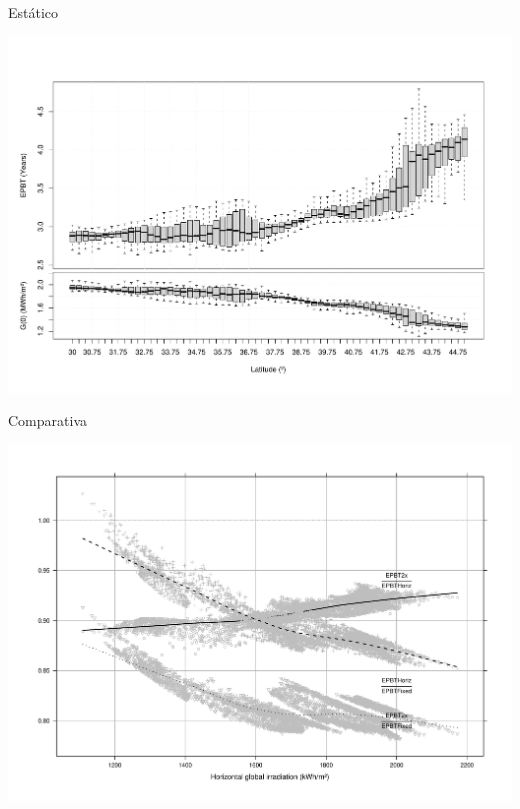 \documentclass[xcolor={usenames,svgnames,dvipsnames}]{beamer}
\begin{document}
\begin{frame}[label={sec:orgd6eb6e4}]{Estático}
\begin{center}
\includegraphics[width=.9\linewidth]{../figs/BoxPlotEPBTEuropa_Fixed.pdf}
\end{center}
\end{frame}

\begin{frame}[label={sec:orgd9bb74d}]{Comparativa}
\begin{center}
\includegraphics[width=.9\linewidth]{../figs/EPBTEuropavsGh2.pdf}
\end{center}
\end{frame}
\end{document}

